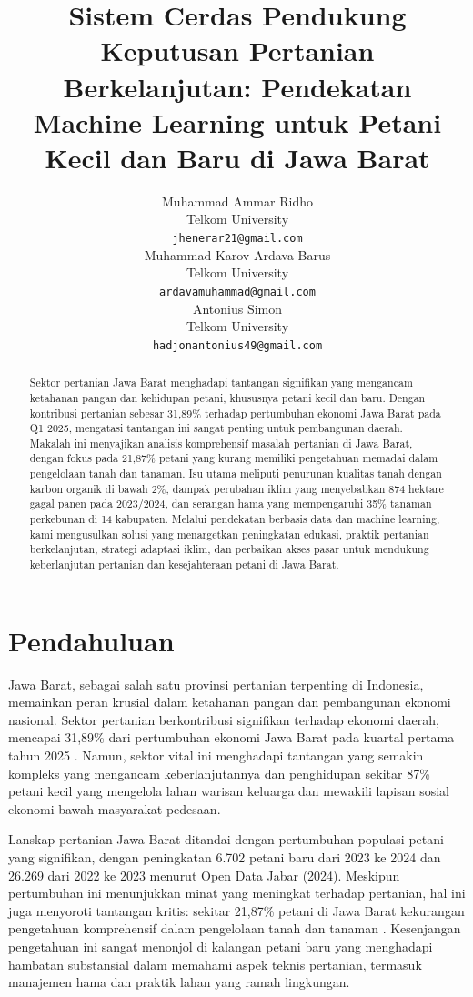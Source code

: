 \documentclass{article} %
\title{Sistem Cerdas Pendukung Keputusan Pertanian Berkelanjutan: Pendekatan Machine Learning untuk Petani Kecil dan Baru di Jawa Barat}
\author{
Muhammad Ammar Ridho \\
Telkom University \\
\texttt{jhenerar21@gmail.com} \\
\And
Muhammad Karov Ardava Barus \\
Telkom University \\
\texttt{ardavamuhammad@gmail.com} \\
\And
Antonius Simon \\
Telkom University \\
\texttt{hadjonantonius49@gmail.com} \\
}
\begin{document}
\maketitle

\begin{abstract}
Sektor pertanian Jawa Barat menghadapi tantangan signifikan yang mengancam ketahanan pangan dan kehidupan petani, khususnya petani kecil dan baru. Dengan kontribusi pertanian sebesar 31,89\% terhadap pertumbuhan ekonomi Jawa Barat pada Q1 2025, mengatasi tantangan ini sangat penting untuk pembangunan daerah. Makalah ini menyajikan analisis komprehensif masalah pertanian di Jawa Barat, dengan fokus pada 21,87\% petani yang kurang memiliki pengetahuan memadai dalam pengelolaan tanah dan tanaman. Isu utama meliputi penurunan kualitas tanah dengan karbon organik di bawah 2\%, dampak perubahan iklim yang menyebabkan 874 hektare gagal panen pada 2023/2024, dan serangan hama yang mempengaruhi 35\% tanaman perkebunan di 14 kabupaten. Melalui pendekatan berbasis data dan machine learning, kami mengusulkan solusi yang menargetkan peningkatan edukasi, praktik pertanian berkelanjutan, strategi adaptasi iklim, dan perbaikan akses pasar untuk mendukung keberlanjutan pertanian dan kesejahteraan petani di Jawa Barat.
\end{abstract}

\section{Pendahuluan}


Jawa Barat, sebagai salah satu provinsi pertanian terpenting di Indonesia, memainkan peran krusial dalam ketahanan pangan dan pembangunan ekonomi nasional. Sektor pertanian berkontribusi signifikan terhadap ekonomi daerah, mencapai 31,89\% dari pertumbuhan ekonomi Jawa Barat pada kuartal pertama tahun 2025 \cite{b1}. Namun, sektor vital ini menghadapi tantangan yang semakin kompleks yang mengancam keberlanjutannya dan penghidupan sekitar 87\% petani kecil yang mengelola lahan warisan keluarga dan mewakili lapisan sosial ekonomi bawah masyarakat pedesaan.

Lanskap pertanian Jawa Barat ditandai dengan pertumbuhan populasi petani yang signifikan, dengan peningkatan 6.702 petani baru dari 2023 ke 2024 dan 26.269 dari 2022 ke 2023 menurut Open Data Jabar (2024). Meskipun pertumbuhan ini menunjukkan minat yang meningkat terhadap pertanian, hal ini juga menyoroti tantangan kritis: sekitar 21,87\% petani di Jawa Barat kekurangan pengetahuan komprehensif dalam pengelolaan tanah dan tanaman \cite{b2}. Kesenjangan pengetahuan ini sangat menonjol di kalangan petani baru yang menghadapi hambatan substansial dalam memahami aspek teknis pertanian, termasuk manajemen hama dan praktik lahan yang ramah lingkungan.
\end{document}
